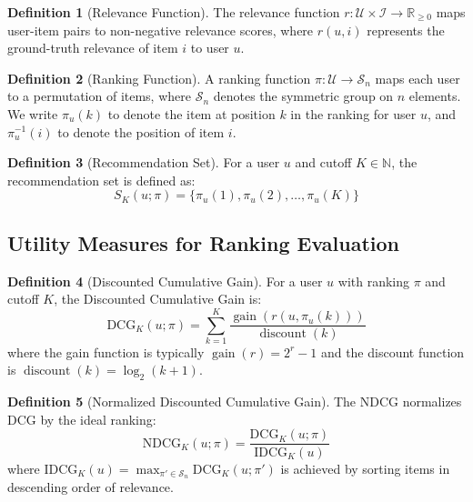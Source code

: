 \documentclass[11pt,a4paper]{article}
\theoremstyle{definition}
\newtheorem{definition}{Definition}[section]
\theoremstyle{plain}
\theoremstyle{remark}
\newcommand{\R}{\mathbb{R}}
\newcommand{\DCG}{\mathrm{DCG}}
\newcommand{\NDCG}{\mathrm{NDCG}}
\newcommand{\IDCG}{\mathrm{IDCG}}
\DeclareMathOperator{\gain}{gain}
\DeclareMathOperator{\discount}{discount}
\begin{document}
\begin{definition}[Relevance Function]
\label{def:relevance}
The relevance function $r: \mathcal{U} \times \mathcal{I} \rightarrow \R_{\geq 0}$ maps user-item pairs to non-negative relevance scores, where $r(u, i)$ represents the ground-truth relevance of item $i$ to user $u$.
\end{definition}

\begin{definition}[Ranking Function]
\label{def:ranking}
A ranking function $\pi: \mathcal{U} \rightarrow \mathcal{S}_n$ maps each user to a permutation of items, where $\mathcal{S}_n$ denotes the symmetric group on $n$ elements. We write $\pi_u(k)$ to denote the item at position $k$ in the ranking for user $u$, and $\pi_u^{-1}(i)$ to denote the position of item $i$.
\end{definition}

\begin{definition}[Recommendation Set]
\label{def:recset}
For a user $u$ and cutoff $K \in \mathbb{N}$, the recommendation set is defined as:
\begin{equation}
    S_K(u; \pi) = \{\pi_u(1), \pi_u(2), \ldots, \pi_u(K)\}
\end{equation}
\end{definition}

\subsection{Utility Measures for Ranking Evaluation}
\label{subsec:utility}

\begin{definition}[Discounted Cumulative Gain]
\label{def:dcg}
For a user $u$ with ranking $\pi$ and cutoff $K$, the Discounted Cumulative Gain is:
\begin{equation}
    \DCG_K(u; \pi) = \sum_{k=1}^{K} \frac{\gain(r(u, \pi_u(k)))}{\discount(k)}
\end{equation}
where the gain function is typically $\gain(r) = 2^r - 1$ and the discount function is $\discount(k) = \log_2(k + 1)$.
\end{definition}

\begin{definition}[Normalized Discounted Cumulative Gain]
\label{def:ndcg}
The NDCG normalizes DCG by the ideal ranking:
\begin{equation}
    \NDCG_K(u; \pi) = \frac{\DCG_K(u; \pi)}{\IDCG_K(u)}
\end{equation}
where $\IDCG_K(u) = \max_{\pi' \in \mathcal{S}_n} \DCG_K(u; \pi')$ is achieved by sorting items in descending order of relevance.
\end{definition}
\end{document}
